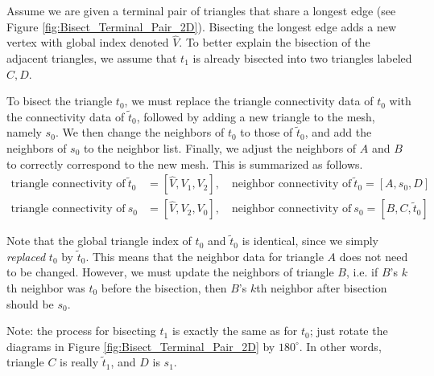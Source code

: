 Assume we are given a terminal pair of triangles that share a longest edge (see Figure \ref{fig:Bisect_Terminal_Pair_2D}).  Bisecting the longest edge adds a new vertex with global index denoted $\widehat{V}$.  To better explain the bisection of the adjacent triangles, we assume that $t_1$ is already bisected into two triangles labeled $C, D$.

To bisect the triangle $t_0$, we must replace the triangle connectivity data of $t_0$ with the connectivity data of $\tilde{t}_0$, followed by adding a new triangle to the mesh, namely $s_0$. We then change the neighbors of $t_0$ to those of $\tilde{t}_0$, and add the neighbors of $s_0$ to the neighbor list.  Finally, we adjust the neighbors of $A$ and $B$ to correctly correspond to the new mesh.  This is summarized as follows.
\begin{equation}\label{eqn:tri_connectivity_and_neighbors}
\begin{split}
    \text{triangle~connectivity~of} ~\tilde{t}_0 &= [\widehat{V}, V_1, V_2], \quad \text{neighbor~connectivity~of} ~\tilde{t}_0 = [A, s_0, D] \\
    \text{triangle~connectivity~of} ~s_0 &= [\widehat{V}, V_2, V_0], \quad \text{neighbor~connectivity~of} ~s_0 = [B, C, \tilde{t}_0]
\end{split}
\end{equation}

Note that the global triangle index of $t_0$ and $\tilde{t}_0$ is identical, since we simply \emph{replaced} $t_0$ by $\tilde{t}_0$.  This means that the neighbor data for triangle $A$ does not need to be changed.  However, we must update the neighbors of triangle $B$, i.e. if $B$'s $k$th neighbor was $t_0$ before the bisection, then $B$'s $k$th neighbor after bisection should be $s_0$.

Note: the process for bisecting $t_1$ is exactly the same as for $t_0$; just rotate the diagrams in Figure \ref{fig:Bisect_Terminal_Pair_2D} by $180^\circ$.  In other words, triangle $C$ is really $\tilde{t}_1$, and $D$ is $s_1$.



